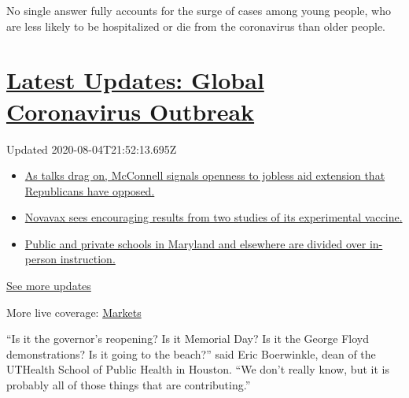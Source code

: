 No single answer fully accounts for the surge of cases among young
people, who are less likely to be hospitalized or die from the
coronavirus than older people.

\hypertarget{latest-updates-global-coronavirus-outbreak}{%
\section{\texorpdfstring{\href{https://www.nytimes3xbfgragh.onion/2020/08/04/world/coronavirus-cases.html?action=click\&pgtype=Article\&state=default\&region=MAIN_CONTENT_1\&context=storylines_live_updates}{Latest
Updates: Global Coronavirus
Outbreak}}{Latest Updates: Global Coronavirus Outbreak}}\label{latest-updates-global-coronavirus-outbreak}}

Updated 2020-08-04T21:52:13.695Z

\begin{itemize}
\tightlist
\item
  \href{https://www.nytimes3xbfgragh.onion/2020/08/04/world/coronavirus-cases.html?action=click\&pgtype=Article\&state=default\&region=MAIN_CONTENT_1\&context=storylines_live_updates\#link-2daa96b5}{As
  talks drag on, McConnell signals openness to jobless aid extension
  that Republicans have opposed.}
\item
  \href{https://www.nytimes3xbfgragh.onion/2020/08/04/world/coronavirus-cases.html?action=click\&pgtype=Article\&state=default\&region=MAIN_CONTENT_1\&context=storylines_live_updates\#link-1228a480}{Novavax
  sees encouraging results from two studies of its experimental
  vaccine.}
\item
  \href{https://www.nytimes3xbfgragh.onion/2020/08/04/world/coronavirus-cases.html?action=click\&pgtype=Article\&state=default\&region=MAIN_CONTENT_1\&context=storylines_live_updates\#link-4825b93}{Public
  and private schools in Maryland and elsewhere are divided over
  in-person instruction.}
\end{itemize}

\href{https://www.nytimes3xbfgragh.onion/2020/08/04/world/coronavirus-cases.html?action=click\&pgtype=Article\&state=default\&region=MAIN_CONTENT_1\&context=storylines_live_updates}{See
more updates}

More live coverage:
\href{https://www.nytimes3xbfgragh.onion/live/2020/08/04/business/stock-market-today-coronavirus?action=click\&pgtype=Article\&state=default\&region=MAIN_CONTENT_1\&context=storylines_live_updates}{Markets}

``Is it the governor's reopening? Is it Memorial Day? Is it the George
Floyd demonstrations? Is it going to the beach?'' said Eric Boerwinkle,
dean of the UTHealth School of Public Health in Houston. ``We don't
really know, but it is probably all of those things that are
contributing.''

